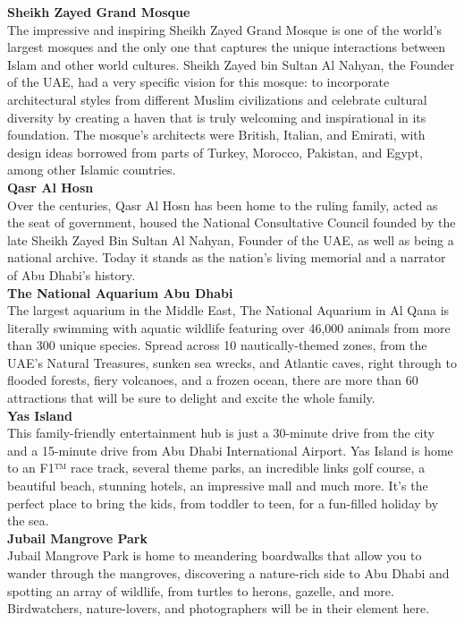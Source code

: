 {\large \textbf{Sheikh Zayed Grand Mosque}}\\
The impressive and inspiring Sheikh Zayed Grand Mosque is one of the world’s largest mosques and the only one that captures the unique interactions between Islam and other world cultures.
 Sheikh Zayed bin Sultan Al Nahyan, the Founder of the UAE, had a very specific vision for this mosque: to incorporate architectural styles from different Muslim civilizations and celebrate cultural diversity by creating a haven that is truly welcoming and inspirational in its foundation.
 The mosque’s architects were British, Italian, and Emirati, with design ideas borrowed from parts of Turkey, Morocco, Pakistan, and Egypt, among other Islamic countries.\\

{\large \textbf{Qasr Al Hosn}}\\
Over the centuries, Qasr Al Hosn has been home to the ruling family, acted as the seat of government,
housed the National Consultative Council founded by the late Sheikh Zayed Bin Sultan Al Nahyan,
Founder of the UAE, as well as being a national archive. Today it stands as the nation’s living memorial and a narrator of Abu Dhabi’s history.\\

{\large \textbf{The National Aquarium Abu Dhabi}}\\
The largest aquarium in the Middle East, The National Aquarium in Al Qana is literally swimming with aquatic wildlife featuring over 46,000 animals from more than 300 unique species.
Spread across 10 nautically-themed zones, from the UAE’s Natural Treasures, sunken sea wrecks, and Atlantic caves, right through to flooded forests, fiery volcanoes, and a frozen ocean,
there are more than 60 attractions that will be sure to delight and excite the whole family.\\

{\large \textbf{Yas Island}}\\
This family-friendly entertainment hub is just a 30-minute drive from the city and a 15-minute drive from Abu Dhabi International Airport.
Yas Island is home to an F1™ race track, several theme parks, an incredible links golf course, a beautiful beach, stunning hotels,
an impressive mall and much more. It’s the perfect place to bring the kids, from toddler to teen, for a fun-filled holiday by the sea.\\

{\large \textbf{Jubail Mangrove Park}}\\
Jubail Mangrove Park is home to meandering boardwalks that allow you to wander through the mangroves,
discovering a nature-rich side to Abu Dhabi and spotting an array of wildlife, from turtles to herons, gazelle, and more.
Birdwatchers, nature-lovers, and photographers will be in their element here.\\

